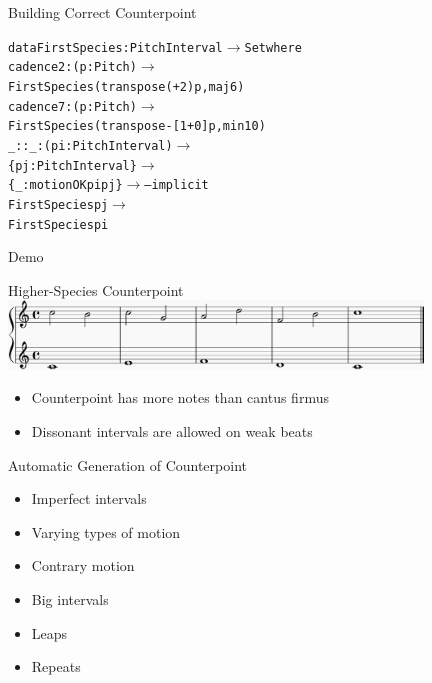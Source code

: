 \documentclass[14pt]{beamer}
\newcommand{\happy}{\textcolor{okcolor}{\smiley}}
\newcommand{\unhappy}{\textcolor{red}{\frownie}}
\newcommand{\ared}[1]{\textcolor{ared}{#1}}
\newcommand{\ablue}[1]{\textcolor{ablue}{#1}}
\newcommand{\agreen}[1]{\textcolor{agreen}{#1}}
\newcommand{\aorange}[1]{\textcolor{aorange}{#1}}
\newcommand{\apurple}[1]{\textcolor{apurple}{#1}}
\newcommand{\clarge}[1]{\begin{center}\begin{large}#1\end{large}\end{center}}
\begin{document}
\begin{frame}[fragile]{Building Correct Counterpoint}
\begin{small}
\begin{alltt}
\aorange{data} \ablue{FirstSpecies} : \ablue{PitchInterval} \(\rightarrow\) \ablue{Set} \aorange{where}
  \agreen{cadence2} : (p : \ablue{Pitch}) \(\rightarrow\)
    \ablue{FirstSpecies} (\ablue{transpose} (\agreen{+} \apurple{2}) p \agreen{,} \agreen{maj6})
  \agreen{cadence7} : (p : \ablue{Pitch}) \(\rightarrow\)
    \ablue{FirstSpecies} (\ablue{transpose} \agreen{-[1+} \apurple{0} \agreen{]} p \agreen{,} \agreen{min10})
  \agreen{\_::\_} : (pi : \ablue{PitchInterval}) \(\rightarrow\)
         \{pj : \ablue{PitchInterval}\} \(\rightarrow\)
         \{\_  : \ablue{motionOK} pi pj\} \(\rightarrow\)  \ared{-- implicit}
         \ablue{FirstSpecies} pj \(\rightarrow\)
         \ablue{FirstSpecies} pi
\end{alltt}
\end{small}
\end{frame}

\begin{frame}
\clarge{Demo}
\end{frame}

\begin{frame}{Higher-Species Counterpoint}
\includegraphics[width=11cm]{figures/second.eps}

\vspace{8mm}

\begin{itemize}
\setlength{\leftskip}{-2mm}
\setlength{\itemsep}{10pt}
\item Counterpoint has more notes than cantus firmus
\item Dissonant intervals are allowed on weak beats
\end{itemize}
\end{frame}

\begin{frame}{Automatic Generation of Counterpoint}
\begin{itemize}
\setlength{\itemsep}{10pt}
\item[\happy] Imperfect intervals
\item[\happy] Varying types of motion
\item[\happy] Contrary motion
\item[\unhappy] Big intervals
\item[\unhappy] Leaps
\item[\unhappy] Repeats
\end{itemize}
\end{frame}
\end{document}
